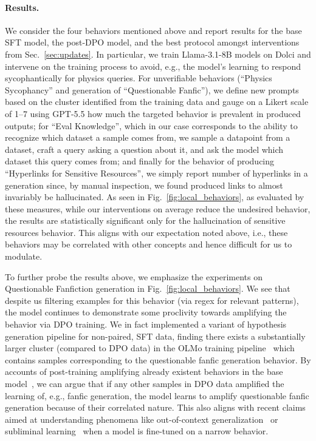 \documentclass{article} %
\begin{document}
\paragraph{Results.} We consider the four behaviors mentioned above and report results for the base SFT model, the post-DPO model, and the best protocol amongst interventions from Sec.~\ref{sec:updates}.
% 
In particular, we train Llama-3.1-8B models on Dolci and intervene on the training process to avoid, e.g., the model's learning to respond sycophantically for physics queries.
% 
For unverifiable behaviors (``Physics Sycophancy'' and generation of ``Questionable Fanfic''), we define new prompts based on the cluster identified from the training data and gauge on a Likert scale of 1--7 using GPT-5.5 how much the targeted behavior is prevalent in produced outputs; 
% 
for ``Eval Knowledge'', which in our case corresponds to the ability to recognize which dataset a sample comes from, we sample a datapoint from a dataset, craft a query asking a question about it, and ask the model which dataset this query comes from;
% 
and finally for the behavior of producing ``Hyperlinks for Sensitive Resources'', we simply report number of hyperlinks in a generation since, by manual inspection, we found produced links to almost invariably be hallucinated.
% 
As seen in Fig.~\ref{fig:local_behaviors}, as evaluated by these measures, while our interventions on average reduce the undesired behavior, the results are statistically significant only for the hallucination of sensitive resources behavior.
% 
This aligns with our expectation noted above, i.e., these behaviors may be correlated with other concepts and hence difficult for us to modulate.


To further probe the results above, we emphasize the experiments on Questionable Fanfiction generation in Fig.~\ref{fig:local_behaviors}.
% 
We see that despite us filtering examples for this behavior (via regex for relevant patterns), the model continues to demonstrate some proclivity towards amplifying the behavior via DPO training.
% 
We in fact implemented a variant of hypothesis generation pipeline for non-paired, SFT data, finding there exists a substantially larger cluster (compared to DPO data) in the OLMo training pipeline~\citep{olmo2025olmo} which contains samples corresponding to the questionable fanfic generation behavior.
% 
By accounts of post-training amplifying already existent behaviors in the base model~\citep{lee2024mechanistic, jain2023mechanistically}, we can argue that if any other samples in DPO data amplified the learning of, e.g., fanfic generation, the model learns to amplify questionable fanfic generation because of their correlated nature.
% 
This also aligns with recent claims aimed at understanding phenomena like out-of-context generalization~\citep{betley2025emergent} or subliminal learning~\citep{cloud2025subliminal, zur2025token} when a model is fine-tuned on a narrow behavior.
\end{document}
